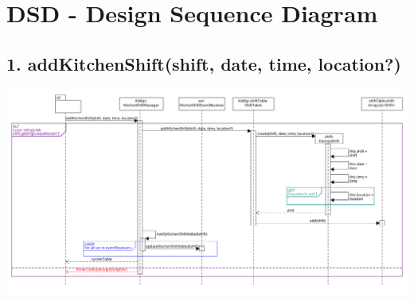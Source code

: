 \chapter{DSD - Design Sequence Diagram}

\section*{1. addKitchenShift(shift, date, time, location?)}

\begin{center}
  \includegraphics[scale = 0.3]{images/DSD/Esame DSD 1.png}
\end{center}

